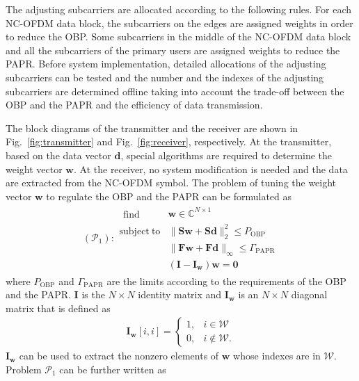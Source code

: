 \documentclass[paper]{ieice}
\begin{document}
The adjusting subcarriers are allocated according to the following rules. For each NC-OFDM data block, the subcarriers on the edges are assigned weights in order to reduce the OBP.  Some subcarriers in the middle of the NC-OFDM data block and all the subcarriers of the primary users are assigned weights to reduce the PAPR.  Before system implementation, detailed allocations of the adjusting subcarriers can be tested and the number and the indexes of the adjusting subcarriers are determined offline taking into account the trade-off between the OBP and the PAPR and the efficiency of data transmission.
 

The block diagrams of the transmitter and the receiver are shown in Fig.~\ref{fig:transmitter} and Fig.~\ref{fig:receiver}, respectively.  At the transmitter, based on the data vector $\mathbf{d}$, special algorithms are required to determine the weight vector $\mathbf{w}$.  At the receiver, no system modification is needed and the data are extracted from the NC-OFDM symbol. The problem of tuning the weight vector $\mathbf{w}$ to regulate the OBP and the PAPR can be formulated as
\begin{eqnarray}
(\mathcal{P}_1):
\begin{array}{ll}
\begin{split}
\mathop{\mathrm{find}}
\end{split}  
& \mathbf{w} \in \mathbb{C}^{N \times 1} \\
\mathrm{subject~to} & \|\mathbf{S}\mathbf{w} + \mathbf{S}\mathbf{d} \|_{2}^2 \leq P_{\mathrm{OBP}} \label{eq:constraint_obp} \\
& \| \mathbf{F}\mathbf{w} + \mathbf{F}\mathbf{d} \|_{\infty} \leq \Gamma_{\mathrm{PAPR}} \label{eq:constraint_papr}\\
&(\mathbf{I}-\mathbf{I}_{\mathbf{w}})\mathbf{w} = \mathbf{0}
\end{array}
\end{eqnarray}
where $P_{\mathrm{OBP}}$ and $\Gamma_{\mathrm{PAPR}}$ are the limits according to the requirements of the OBP and the PAPR.  
$\mathbf{I}$ is the $N \times N$ identity matrix and $\mathbf{I}_{\mathbf{w}}$ is an $N \times N$ diagonal matrix that is defined as
\begin{eqnarray}
\mathbf{I}_{\mathbf{w}}[i,i] =\left\{\begin{array}{ll}
1, & i \in \mathcal{W}\\
0, & i \notin \mathcal{W}.
\end{array}\right.
\end{eqnarray}
$\mathbf{I}_{\mathbf{w}}$ can be used to extract the nonzero elements of $\mathbf{w}$ whose indexes are in $\mathcal{W}$.  Problem $\mathcal{P}_1$ can be further written as
\end{document}
